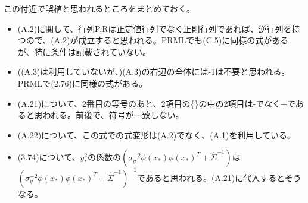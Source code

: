 \documentclass{jsarticle}
\begin{document}
この付近で誤植と思われるところをまとめておく。
\begin{itemize}
\item (A.2)に関して、行列P,Rは正定値行列でなく正則行列であれば、逆行列を持つので、(A.2)が成立すると思われる。PRMLでも(C.5)に同様の式があるが、特に条件は記載されていない。
\item ((A.3)は利用していないが、)(A.3)の右辺の全体には-1は不要と思われる。PRMLで(2.76)に同様の式がある。
\item (A.21)について、2番目の等号のあと、2項目の\{\}の中の2項目は-でなく+であると思われる。前後で、符号が一致しない。
\item (A.22)について、この式での式変形は(A.2)でなく、(A.1)を利用している。
\item (3.74)について、$y_*^2$の係数の$(\sigma_y^{-2}\phi(x_*)\phi(x_*)^T + \hat{\Sigma}^{-1})$は
$(\sigma_y^{-2}\phi(x_*)\phi(x_*)^T + \hat{\Sigma}^{-1})^{-1}$であると思われる。(A.21)に代入するとそうなる。
\end{itemize}
\end{document}
